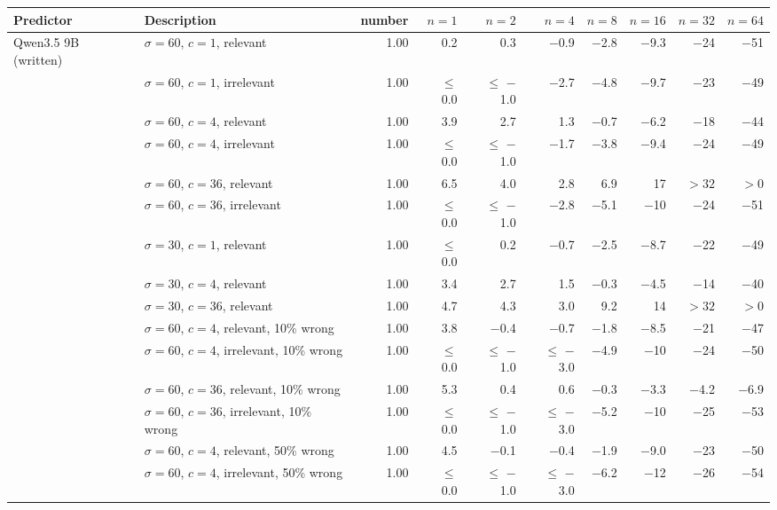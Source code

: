 \begin{tabular}{llrrrrrrrr}
\toprule
Predictor & Description & number & $n = 1$ & $n = 2$ & $n = 4$ & $n = 8$ & $n = 16$ & $n = 32$ & $n = 64$ \\
\midrule
Qwen3.5 9B (written) & $\sigma = 60$, $c = 1$, relevant & 1.00 & 0.2 & 0.3 & $-$0.9 & $-$2.8 & $-$9.3 & $-$24 & $-$51 \\
 & $\sigma = 60$, $c = 1$, irrelevant & 1.00 & $\leq$ 0.0 & $\leq$ $-$1.0 & $-$2.7 & $-$4.8 & $-$9.7 & $-$23 & $-$49 \\
 & $\sigma = 60$, $c = 4$, relevant & 1.00 & 3.9 & 2.7 & 1.3 & $-$0.7 & $-$6.2 & $-$18 & $-$44 \\
 & $\sigma = 60$, $c = 4$, irrelevant & 1.00 & $\leq$ 0.0 & $\leq$ $-$1.0 & $-$1.7 & $-$3.8 & $-$9.4 & $-$24 & $-$49 \\
 & $\sigma = 60$, $c = 36$, relevant & 1.00 & 6.5 & 4.0 & 2.8 & 6.9 & 17 & $> 32$ & $> 0$ \\
 & $\sigma = 60$, $c = 36$, irrelevant & 1.00 & $\leq$ 0.0 & $\leq$ $-$1.0 & $-$2.8 & $-$5.1 & $-$10 & $-$24 & $-$51 \\
 & $\sigma = 30$, $c = 1$, relevant & 1.00 & $\leq$ 0.0 & 0.2 & $-$0.7 & $-$2.5 & $-$8.7 & $-$22 & $-$49 \\
 & $\sigma = 30$, $c = 4$, relevant & 1.00 & 3.4 & 2.7 & 1.5 & $-$0.3 & $-$4.5 & $-$14 & $-$40 \\
 & $\sigma = 30$, $c = 36$, relevant & 1.00 & 4.7 & 4.3 & 3.0 & 9.2 & 14 & $> 32$ & $> 0$ \\
 & $\sigma = 60$, $c = 4$, relevant, 10\% wrong & 1.00 & 3.8 & $-$0.4 & $-$0.7 & $-$1.8 & $-$8.5 & $-$21 & $-$47 \\
 & $\sigma = 60$, $c = 4$, irrelevant, 10\% wrong & 1.00 & $\leq$ 0.0 & $\leq$ $-$1.0 & $\leq$ $-$3.0 & $-$4.9 & $-$10 & $-$24 & $-$50 \\
 & $\sigma = 60$, $c = 36$, relevant, 10\% wrong & 1.00 & 5.3 & 0.4 & 0.6 & $-$0.3 & $-$3.3 & $-$4.2 & $-$6.9 \\
 & $\sigma = 60$, $c = 36$, irrelevant, 10\% wrong & 1.00 & $\leq$ 0.0 & $\leq$ $-$1.0 & $\leq$ $-$3.0 & $-$5.2 & $-$10 & $-$25 & $-$53 \\
 & $\sigma = 60$, $c = 4$, relevant, 50\% wrong & 1.00 & 4.5 & $-$0.1 & $-$0.4 & $-$1.9 & $-$9.0 & $-$23 & $-$50 \\
 & $\sigma = 60$, $c = 4$, irrelevant, 50\% wrong & 1.00 & $\leq$ 0.0 & $\leq$ $-$1.0 & $\leq$ $-$3.0 & $-$6.2 & $-$12 & $-$26 & $-$54 \\

\end{tabular}
